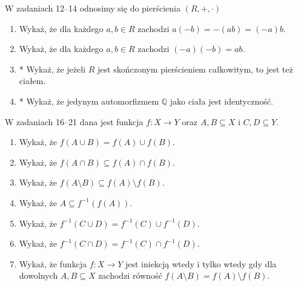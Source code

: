 \documentclass{article}
\begin{document}
W zadaniach 12--14 odnosimy się do pierścienia $(R, +, \cdot)$
\begin{enumerate}[resume]
    \item Wykaż, że dla każdego $a,b \in R$ zachodzi $a(-b) = -(ab) = (-a)b$.
    \item Wykaż, że dla każdego $a,b \in R$ zachodzi $(-a)(-b) = ab$.
    \item * Wykaż, że jeżeli $R$ jest skończonym pierścieniem całkowitym, to jest też ciałem.
    \item * Wykaż, że jedynym automorfizmem $\mathbb{Q}$ jako ciała jest identyczność.
\end{enumerate}

W zadaniach 16--21 dana jest funkcja $f : X \rightarrow Y$ oraz $A,B \subseteq X$ i $C,D \subseteq Y$.
\begin{enumerate}[resume]
    \item Wykaż, że $f(A \cup B) = f(A) \cup f(B)$.
    \item Wykaż, że $f(A \cap B) \subseteq f(A) \cap f(B)$.
    \item Wykaż, że $f(A \setminus B) \subseteq f(A) \setminus f(B)$.
    \item Wykaż, że $A \subseteq f^{-1}(f(A))$.
    \item Wykaż, że $f^{-1}(C \cup D) = f^{-1}(C) \cup f^{-1}(D)$.
    \item Wykaż, że $f^{-1}(C \cap D) = f^{-1}(C) \cap f^{-1}(D)$.
    \item Wykaż, że funkcja $f : X \rightarrow Y$ jest iniekcją wtedy i tylko wtedy gdy dla dowolnych $A, B \subseteq X$ zachodzi równość $f(A\setminus B) = f(A) \setminus f(B)$.
\end{enumerate}
\end{document}
